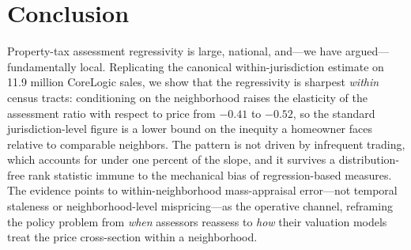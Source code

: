 \documentclass[12pt, letterpaper]{article}
\begin{document}
\section{Conclusion}\label{sec:conclusion}

Property-tax assessment regressivity is large, national, and---we have argued---fundamentally local. Replicating the canonical within-jurisdiction estimate on 11.9 million CoreLogic sales, we show that the regressivity is sharpest \emph{within} census tracts: conditioning on the neighborhood raises the elasticity of the assessment ratio with respect to price from $-0.41$ to $-0.52$, so the standard jurisdiction-level figure is a lower bound on the inequity a homeowner faces relative to comparable neighbors. The pattern is not driven by infrequent trading, which accounts for under one percent of the slope, and it survives a distribution-free rank statistic immune to the mechanical bias of regression-based measures. The evidence points to within-neighborhood mass-appraisal error---not temporal staleness or neighborhood-level mispricing---as the operative channel, reframing the policy problem from \emph{when} assessors reassess to \emph{how} their valuation models treat the price cross-section within a neighborhood.




\end{document}
